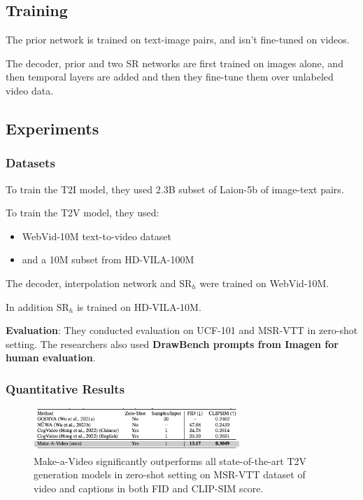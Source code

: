\subsection{Training}

The prior network is trained on text-image pairs, and isn't fine-tuned on videos.

The decoder, prior and two SR networks are first trained on images alone, and then temporal layers are added and then they fine-tune them over unlabeled video data.





\subsection{Experiments}

\subsubsection{Datasets}

To train the T2I model, they used 2.3B subset of Laion-5b \cite{laion_5b} of image-text pairs.

To train the T2V model, they used:
\begin{itemize}
    \item WebVid-10M \cite{webvid_10m} text-to-video dataset
    \item and a 10M subset from HD-VILA-100M \cite{hd_vila_100m}
\end{itemize}

The decoder, interpolation network and $\text{SR}_h$ were trained on WebVid-10M.

In addition $\text{SR}_h$ is trained on HD-VILA-10M.

\textbf{Evaluation}: They conducted evaluation on UCF-101 \cite{ucf_101} and MSR-VTT \cite{msr_vtt} in zero-shot setting. The researchers also used \textbf{DrawBench prompts from Imagen for human evaluation}.



\subsubsection{Quantitative Results}

\begin{figure}[h]
    \centering
    \includegraphics[width=0.7\textwidth]{images/make_a_video/zero_shot_eval.png}
    \caption{Make-a-Video significantly outperforms all state-of-the-art T2V generation models in zero-shot setting on MSR-VTT \cite{msr_vtt} dataset of video  and captions in both FID and CLIP-SIM score.}
    \label{fig:make_a_video_zeroshot_eval}
\end{figure}


